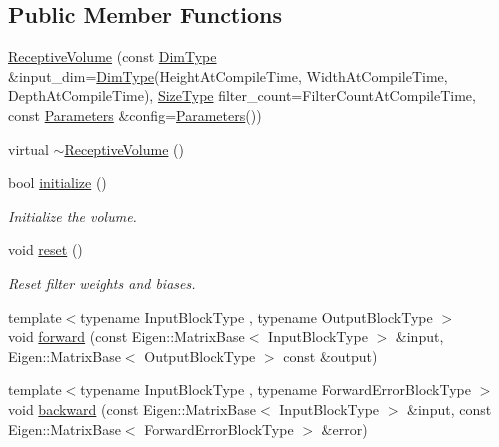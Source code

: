 \subsection*{Public Member Functions}
\begin{DoxyCompactItemize}
\item 
\hyperlink{classffnn_1_1layer_1_1_receptive_volume_ac6196e0bdd72e485c5cddd77cb8dc7ef}{Receptive\-Volume} (const \hyperlink{classffnn_1_1layer_1_1_receptive_volume_ab0bd7607040aa08bf9cdfcc30e2794ef}{Dim\-Type} \&input\-\_\-dim=\hyperlink{classffnn_1_1layer_1_1_receptive_volume_ab0bd7607040aa08bf9cdfcc30e2794ef}{Dim\-Type}(Height\-At\-Compile\-Time, Width\-At\-Compile\-Time, Depth\-At\-Compile\-Time), \hyperlink{classffnn_1_1layer_1_1internal_1_1_interface_af0567642f60c65b5e87067226a54174b}{Size\-Type} filter\-\_\-count=Filter\-Count\-At\-Compile\-Time, const \hyperlink{structffnn_1_1layer_1_1_receptive_volume_1_1_parameters}{Parameters} \&config=\hyperlink{structffnn_1_1layer_1_1_receptive_volume_1_1_parameters}{Parameters}())
\item 
virtual \hyperlink{classffnn_1_1layer_1_1_receptive_volume_a3d0202e34f98d891958a40c957128c02}{$\sim$\-Receptive\-Volume} ()
\item 
bool \hyperlink{classffnn_1_1layer_1_1_receptive_volume_a0fc5e18276c0f5d9f052d4a92349ca48}{initialize} ()
\begin{DoxyCompactList}\small\item\em Initialize the volume. \end{DoxyCompactList}\item 
void \hyperlink{classffnn_1_1layer_1_1_receptive_volume_affdd2d6fe24078deedb324c979cd08e4}{reset} ()
\begin{DoxyCompactList}\small\item\em Reset filter weights and biases. \end{DoxyCompactList}\item 
{\footnotesize template$<$typename Input\-Block\-Type , typename Output\-Block\-Type $>$ }\\void \hyperlink{classffnn_1_1layer_1_1_receptive_volume_ab4ff3f2b9bc68dfb56d8f01c53a664d8}{forward} (const Eigen\-::\-Matrix\-Base$<$ Input\-Block\-Type $>$ \&input, Eigen\-::\-Matrix\-Base$<$ Output\-Block\-Type $>$ const \&output)
\item 
{\footnotesize template$<$typename Input\-Block\-Type , typename Forward\-Error\-Block\-Type $>$ }\\void \hyperlink{classffnn_1_1layer_1_1_receptive_volume_a58a22d009cc7da6aa08a9e87f81a4eb3}{backward} (const Eigen\-::\-Matrix\-Base$<$ Input\-Block\-Type $>$ \&input, const Eigen\-::\-Matrix\-Base$<$ Forward\-Error\-Block\-Type $>$ \&error)

\end{DoxyCompactItemize}
